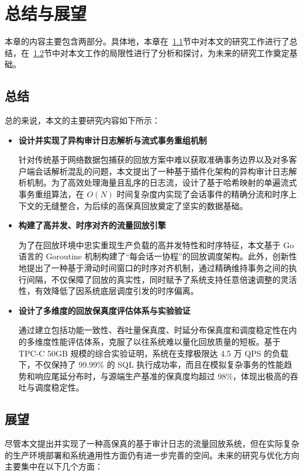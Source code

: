 \newpage
\setcounter{table}{0}
\setcounter{figure}{0}
\section{总结与展望}

本章的内容主要包含两部分。具体地，本章在~\ref{summarize}节中对本文的研究工作进行了总结，在~\ref{future}节中对本文工作的局限性进行了分析和探讨，为未来的研究工作奠定基础。


\subsection{总结}\label{summarize}





总的来说，本文的主要研究内容如下所示：
\begin{itemize}
	\item[(1)]  \textbf{设计并实现了异构审计日志解析与流式事务重组机制}
	
    针对传统基于网络数据包捕获的回放方案中难以获取准确事务边界以及对多客户端会话解析混乱的问题，本文提出了一种基于插件化架构的异构审计日志解析机制。为了高效处理海量且乱序的日志流，设计了基于哈希映射的单遍流式事务重组算法，在 $O(N)$ 时间复杂度内实现了会话事件的精确分流和时序上下文的无缝整合，为后续的高保真回放奠定了坚实的数据基础。
	
	\item[(2)] \textbf{构建了高并发、时序对齐的流量回放引擎}
	
    为了在回放环境中忠实重现生产负载的高并发特性和时序特征，本文基于 Go 语言的 Goroutine 机制构建了“每会话一协程”的回放调度架构。此外，创新性地提出了一种基于滑动时间窗口的时序对齐机制，通过精确维持事务之间的执行间隔，不仅保障了回放的真实性，同时赋予了系统支持任意倍速调整的灵活性，有效降低了因系统底层调度引发的时序偏离。
	
	\item[(3)] \textbf{设计了多维度的回放保真度评估体系与实验验证}

    通过建立包括功能一致性、吞吐量保真度、时延分布保真度和调度稳定性在内的多维度性能评估体系，克服了以往系统难以量化回放质量的短板。基于 TPC-C 50GB 规模的综合实验证明，系统在支撑极限达 4.5 万 QPS 的负载下，不仅保持了 99.99\% 的 SQL 执行成功率，而且在模拟复杂事务的性能趋势和响应尾延分布时，与源端生产基准的保真度均超过 98\%，体现出极高的吞吐与调度稳定性。
	
\end{itemize}


\subsection{展望}\label{future}
尽管本文提出并实现了一种高保真的基于审计日志的流量回放系统，但在实际复杂的生产环境部署和系统通用性方面仍有进一步完善的空间。未来的研究与优化方向主要集中在以下几个方面：

